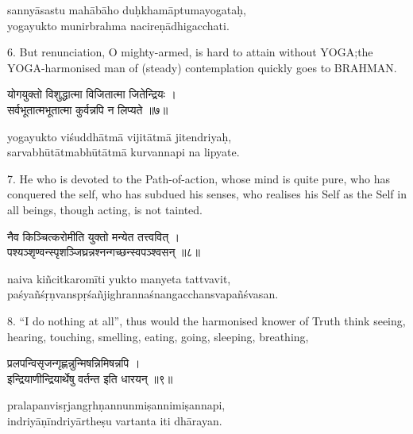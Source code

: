 \begin{transliteration}
sannyāsastu mahābāho duḥkhamāptumayogataḥ, \\
yogayukto munirbrahma nacireṇādhigacchati.
\end{transliteration}

6. But renunciation, O mighty-armed, is hard to attain without YOGA;\@ the
YOGA-harmonised man of (steady) contemplation quickly goes to BRAHMAN.\@

\begin{gitaverse}
योगयुक्तो विशुद्धात्मा विजितात्मा जितेन्द्रियः । \\
सर्वभूतात्मभूतात्मा कुर्वन्नपि न लिप्यते ॥७॥
\end{gitaverse}

\begin{transliteration}
yogayukto viśuddhātmā vijitātmā jitendriyaḥ, \\
sarvabhūtātmabhūtātmā kurvannapi na lipyate.
\end{transliteration}

7. He who is devoted to the Path-of-action, whose mind is quite pure, who has
conquered the self, who has subdued his senses, who realises his Self as the
Self in all beings, though acting, is not tainted.

\begin{gitaverse}
नैव किञ्चित्करोमीति युक्तो मन्येत तत्त्ववित् । \\
पश्यञ्शृण्वन्स्पृशञ्जिघ्रन्नश्नन्गच्छन्स्वपञ्श्वसन् ॥८॥
\end{gitaverse}

\begin{transliteration}
naiva kiñcitkaromīti yukto manyeta tattvavit, \\
paśyañśṛṇvanspṛśañjighrannaśnangacchansvapañśvasan.
\end{transliteration}

8. ``I do nothing at all'', thus would the harmonised knower of Truth think
seeing, hearing, touching, smelling, eating, going, sleeping, breathing,

\begin{gitaverse}
प्रलपन्विसृजन्गृह्णन्नुन्मिषन्निमिषन्नपि । \\
इन्द्रियाणीन्द्रियार्थेषु वर्तन्त इति धारयन् ॥९॥
\end{gitaverse}

\begin{transliteration}
pralapanvisṛjangṛhṇannunmiṣannimiṣannapi, \\
indriyāṇīndriyārtheṣu vartanta iti dhārayan.
\end{transliteration}

